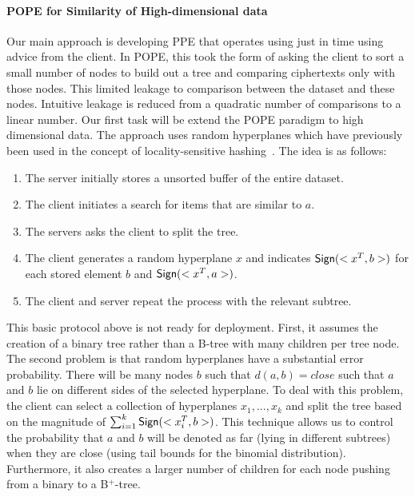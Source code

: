 \paragraph{POPE for Similarity of High-dimensional data}
Our main approach is developing PPE that operates using just in time using advice from the client.  In POPE, this took the form of asking the client to sort a small number of nodes to build out a tree and comparing ciphertexts only with those nodes.  This limited leakage to comparison between the dataset and these nodes.  Intuitive leakage is reduced from a quadratic number of comparisons to a linear number.  Our first task will be extend the POPE paradigm to high dimensional data.  The approach uses random hyperplanes which have previously been used in the concept of locality-sensitive hashing~\cite{charikar2002similarity}.  The idea is as follows:

\begin{enumerate}\setlength\itemsep{0em}
\item The server initially stores a unsorted buffer of the entire dataset.
\item The client initiates a search for items that are similar to $a$.
\item The servers asks the client to split the tree.
\item The client generates a random hyperplane $x$ and indicates $\mathsf{Sign}(<x^T,b>)$ for each stored element $b$ and $\mathsf{Sign}(<x^T,a>)$.
\item The client and server repeat the process with the relevant subtree.
\end{enumerate} 

\noindent This basic protocol above is not ready for deployment.  First, it assumes the creation of a binary tree rather than a B-tree with many children per tree node. The second problem is that random hyperplanes have a substantial error probability.  There will be many nodes $b$ such that $d(a, b)=close$ such that $a$ and $b$ lie on different sides of the selected hyperplane.  To deal with this problem, the client can select a collection of hyperplanes $x_1,..., x_k$ and split the tree based on the magnitude of $\sum_{i=1}^k \mathsf{Sign}(<x_i^T, b>)$.  This technique allows us to control the probability that $a$ and $b$ will be denoted as far (lying in different subtrees) when they are close (using tail bounds for the binomial distribution).  Furthermore, it also creates a larger number of children for each node pushing from a binary to a B$^+$-tree.


